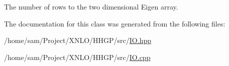 The number of rows to the two dimensional Eigen array. 

The documentation for this class was generated from the following files\+:\begin{DoxyCompactItemize}
\item 
/home/sam/\+Project/\+X\+N\+L\+O/\+H\+H\+G\+P/src/\hyperlink{_i_o_8hpp}{I\+O.\+hpp}\item 
/home/sam/\+Project/\+X\+N\+L\+O/\+H\+H\+G\+P/src/\hyperlink{_i_o_8cpp}{I\+O.\+cpp}\end{DoxyCompactItemize}
